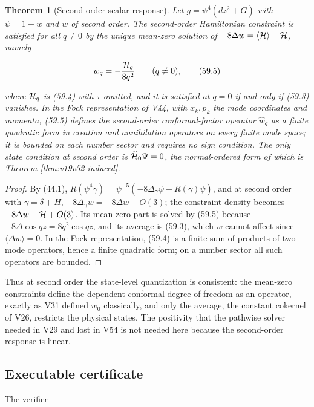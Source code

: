 \documentclass[11pt]{article}
\newtheorem{theorem}{Theorem}[section]
\theoremstyle{remark}
\begin{document}
\begin{theorem}[Second-order scalar response]
\label{thm:v19v56-response}
Let \(g=\psi^4(dz^2+G)\) with \(\psi=1+w\) and \(w\) of second order.
The second-order Hamiltonian constraint is satisfied for all
\(q\neq0\) by the unique mean-zero solution of
\(-8\Delta w=\langle{\cal H}\rangle-{\cal H}\), namely

\[
 w_q=-\frac{{\cal H}_q}{8q^2}\qquad(q\neq0),                          \tag{59.5}
\]

where \({\cal H}_q\) is (59.4) with \(\tau\) omitted, and it is
satisfied at \(q=0\) if and only if (59.3) vanishes.  In the Fock
representation of V44, with \(x_k,p_k\) the mode coordinates and
momenta, (59.5) defines the second-order conformal-factor operator
\(\hat w_q\) as a finite quadratic form in creation and annihilation
operators on every finite mode space; it is bounded on each number
sector and requires no sign condition.  The only state condition at
second order is \(\widehat{\cal H}_0\Psi=0\), the normal-ordered form
of which is Theorem \ref{thm:v19v52-induced}.
\end{theorem}

\begin{proof}
By (44.1), \(R(\psi^4\gamma)=\psi^{-5}(-8\Delta_\gamma\psi+R(\gamma)\psi)\),
and at second order with \(\gamma=\delta+H\), \(-8\Delta_\gamma w=-8\Delta w+O(3)\);
the constraint density becomes \(-8\Delta w+{\cal H}+O(3)\).  Its
mean-zero part is solved by (59.5) because \(-8\Delta\cos qz=8q^2\cos qz\),
and its average is (59.3), which \(w\) cannot affect since
\(\langle\Delta w\rangle=0\).  In the Fock representation, (59.4) is a
finite sum of products of two mode operators, hence a finite quadratic
form; on a number sector all such operators are bounded.
\end{proof}

Thus at second order the state-level quantization is consistent: the
mean-zero constraints define the dependent conformal degree of freedom
as an operator, exactly as V31 defined \(w_0\) classically, and only
the average, the constant cokernel of V26, restricts the physical
states.  The positivity that the pathwise solver needed in V29 and lost
in V54 is not needed here because the second-order response is linear.

\subsection{Executable certificate}

The verifier
\end{document}

